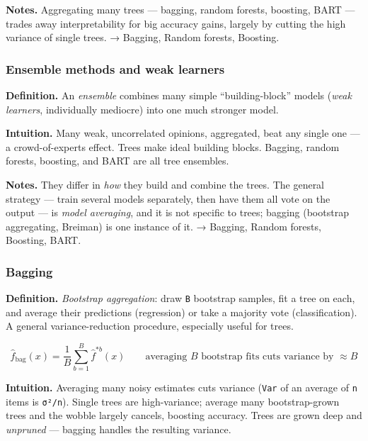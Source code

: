 \documentclass[
  10pt,
  letterpaper,
  onecolumn]{article}
\begin{document}
\textbf{Notes.} Aggregating many trees --- bagging, random forests,
boosting, BART --- trades away interpretability for big accuracy gains,
largely by cutting the high variance of single trees. → Bagging, Random
forests, Boosting.

\hypertarget{ensemble-methods-and-weak-learners}{%
\subsubsection{Ensemble methods and weak
learners}\label{ensemble-methods-and-weak-learners}}

\textbf{Definition.} An \emph{ensemble} combines many simple
``building-block'' models (\emph{weak learners}, individually mediocre)
into one much stronger model.

\textbf{Intuition.} Many weak, uncorrelated opinions, aggregated, beat
any single one --- a crowd-of-experts effect. Trees make ideal building
blocks. Bagging, random forests, boosting, and BART are all tree
ensembles.

\textbf{Notes.} They differ in \emph{how} they build and combine the
trees. The general strategy --- train several models separately, then
have them all vote on the output --- is \emph{model averaging}, and it
is not specific to trees; bagging (bootstrap aggregating, Breiman) is
one instance of it. → Bagging, Random forests, Boosting, BART.

\hypertarget{bagging}{%
\subsubsection{Bagging}\label{bagging}}

\textbf{Definition.} \emph{Bootstrap aggregation}: draw \texttt{B}
bootstrap samples, fit a tree on each, and average their predictions
(regression) or take a majority vote (classification). A general
variance-reduction procedure, especially useful for trees.

\begin{equation*}
\hat f_{\text{bag}}(x)=\frac{1}{B}\sum_{b=1}^{B}\hat f^{*b}(x)
\qquad\text{averaging }B\text{ bootstrap fits cuts variance by }\approx B
\end{equation*}

\textbf{Intuition.} Averaging many noisy estimates cuts variance
(\texttt{Var} of an average of \texttt{n} items is \texttt{σ²/n}).
Single trees are high-variance; average many bootstrap-grown trees and
the wobble largely cancels, boosting accuracy. Trees are grown deep and
\emph{unpruned} --- bagging handles the resulting variance.
\end{document}
